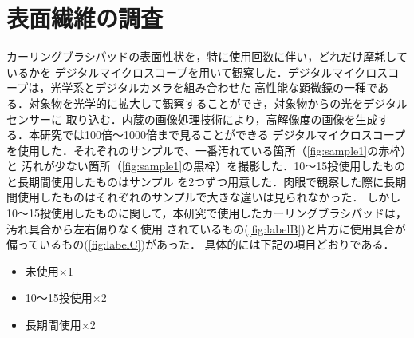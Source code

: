 \documentclass[main]{subfiles}
\begin{document}
\section{表面繊維の調査}

カーリングブラシパッドの表面性状を，特に使用回数に伴い，どれだけ摩耗しているかを
デジタルマイクロスコープを用いて観察した．デジタルマイクロスコープは，光学系とデジタルカメラを組み合わせた
高性能な顕微鏡の一種である．対象物を光学的に拡大して観察することができ，対象物からの光をデジタルセンサーに
取り込む．内蔵の画像処理技術により，高解像度の画像を生成する．本研究では100倍～1000倍まで見ることができる
デジタルマイクロスコープを使用した．それぞれのサンプルで、一番汚れている箇所（\ref{fig:sample1}の赤枠）と
汚れが少ない箇所（\ref{fig:sample1}の黒枠）を撮影した．10～15投使用したものと長期間使用したものはサンプル
を2つずつ用意した．肉眼で観察した際に長期間使用したものはそれぞれのサンプルで大きな違いは見られなかった．
しかし10～15投使用したものに関して，本研究で使用したカーリングブラシパッドは，汚れ具合から左右偏りなく使用
されているもの(\ref{fig:labelB})と片方に使用具合が偏っているもの(\ref{fig:labelC})があった．
具体的には下記の項目どおりである．

\begin{itemize}
    \item 未使用×1
    \item 10～15投使用×2
    \item 長期間使用×2
\end{itemize}
\end{document}

